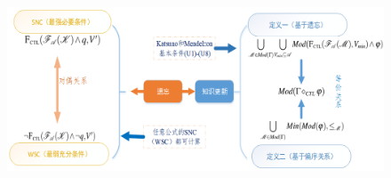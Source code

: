 \documentclass[aspectratio=1610, 9pt, CJK]{beamer}
\begin{document}
\begin{frame}
\begin{figure}
%		
%		
%	
%		
	\includegraphics[scale=0.4]{figures/sncAndWsc0}
\end{figure} 
\end{frame}
\end{document}
